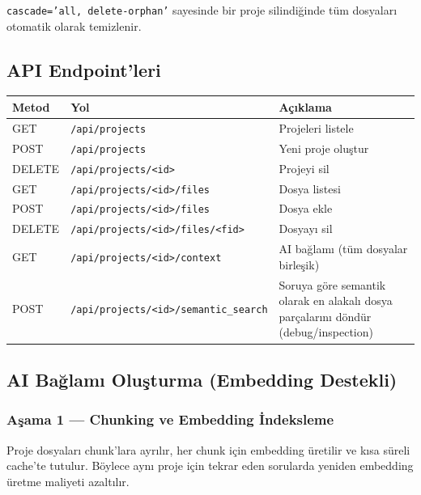 \documentclass[12pt,a4paper]{article}
\begin{document}
\texttt{cascade='all, delete-orphan'} sayesinde bir proje silindiğinde tüm dosyaları otomatik olarak temizlenir.

\subsection{API Endpoint'leri}

\begin{tabularx}{\textwidth}{llX}
\toprule
\textbf{Metod} & \textbf{Yol} & \textbf{Açıklama} \\
\midrule
GET    & \texttt{/api/projects}                  & Projeleri listele \\
POST   & \texttt{/api/projects}                  & Yeni proje oluştur \\
DELETE & \texttt{/api/projects/<id>}             & Projeyi sil \\
GET    & \texttt{/api/projects/<id>/files}       & Dosya listesi \\
POST   & \texttt{/api/projects/<id>/files}       & Dosya ekle \\
DELETE & \texttt{/api/projects/<id>/files/<fid>} & Dosyayı sil \\
GET    & \texttt{/api/projects/<id>/context}     & AI bağlamı (tüm dosyalar birleşik) \\
POST   & \texttt{/api/projects/<id>/semantic\_search} & Soruya göre semantik olarak en alakalı dosya parçalarını döndür (debug/inspection) \\
\bottomrule
\end{tabularx}

\subsection{AI Bağlamı Oluşturma (Embedding Destekli)}

\subsubsection{Aşama 1 — Chunking ve Embedding İndeksleme}

Proje dosyaları chunk'lara ayrılır, her chunk için embedding üretilir ve kısa süreli cache'te tutulur. Böylece aynı proje için tekrar eden sorularda yeniden embedding üretme maliyeti azaltılır.
\end{document}
